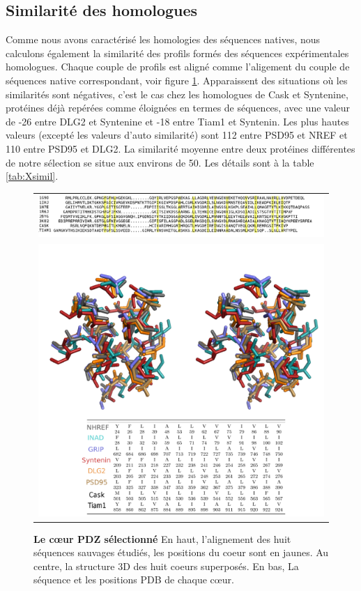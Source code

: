     \subsection{Similarité des homologues}

Comme nous avons caractérisé les homologies des séquences natives, nous calculons également la similarité des profils formés des séquences expérimentales homologues. Chaque couple de profils est aligné comme l'aligement du couple de séquences native correspondant, voir figure \ref{fig:corePDZ}. Apparaissent des situations où les similarités sont négatives, c'est le cas chez les homologues de Cask et Syntenine, protéines déjà repérées comme éloignées en termes de séquences, avec une valeur de -26 entre DLG2 et Syntenine et -18 entre Tiam1  et Syntenin. Les plus hautes valeurs (excepté les valeurs d'auto similarité) sont  112 entre PSD95 et NREF et 110 entre PSD95 et DLG2. La similarité moyenne entre deux protéines différentes de notre sélection se situe aux environs de 50. Les détails sont à la table \ref{tab:Xsimil}. 
    

    \begin{figure}[t]
      \label{fig:corePDZ}      
     \centering
     \begin{tabular}{c}
       \includegraphics[width=18cm]{images/natives_alignees.png} \\
       \includegraphics[width=16cm]{images/corePDZ2.png} \\
     \end{tabular}
     \caption{\textbf{Le cœur PDZ sélectionné} En haut, l'alignement des huit séquences sauvages étudiés, les positions du coeur sont en jaunes. Au centre, la structure 3D des huit coeurs superposés. En bas, La séquence et les \og positions PDB \fg de chaque cœur.}
   \end{figure}
